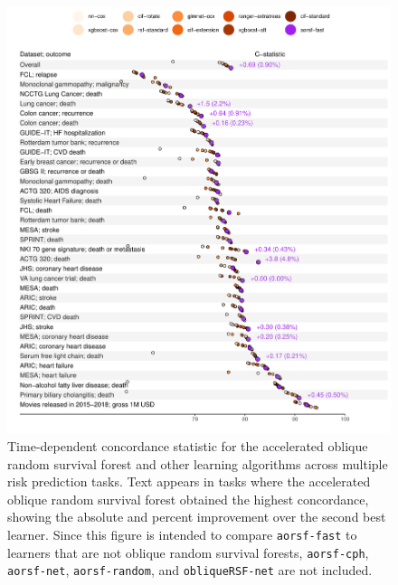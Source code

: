 \documentclass{article}\usepackage[]{graphicx}\usepackage[]{xcolor}
\makeatletter
\def\maxwidth{ %
  \ifdim\Gin@nat@width>\linewidth
    \linewidth
  \else
    \Gin@nat@width
  \fi
}
\newenvironment{knitrout}{}{} %
\makeatother
\begin{document}
\begin{knitrout}
\color{fgcolor}\begin{figure}
\includegraphics[width=\maxwidth]{figure/bm_pred_viz_cstat-1} \caption[Time-dependent concordance statistic for the accelerated oblique random survival forest and other learning algorithms across multiple risk prediction tasks]{Time-dependent concordance statistic for the accelerated oblique random survival forest and other learning algorithms across multiple risk prediction tasks. Text appears in tasks where the accelerated oblique random survival forest obtained the highest concordance, showing the absolute and percent improvement over the second best learner. Since this figure is intended to compare \texttt{aorsf-fast} to learners that are not oblique random survival forests, \texttt{aorsf-cph}, \texttt{aorsf-net}, \texttt{aorsf-random}, and \texttt{obliqueRSF-net} are not included.}\label{fig:bm_pred_viz_cstat}
\end{figure}

\end{knitrout}
\end{document}
